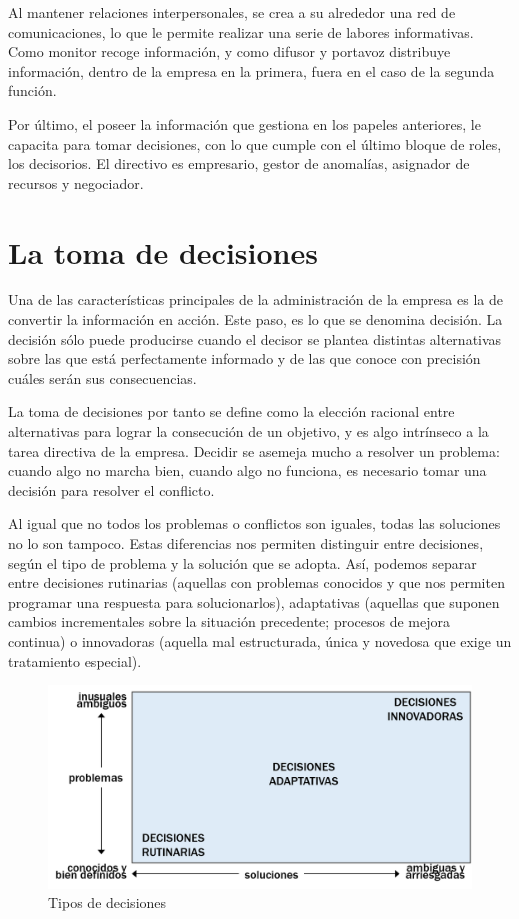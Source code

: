 \documentclass[
]{krantz}
\begin{document}
Al mantener relaciones interpersonales, se crea a su alrededor una red de comunicaciones, lo que le permite realizar una serie de labores informativas. Como monitor recoge información, y como difusor y portavoz distribuye información, dentro de la empresa en la primera, fuera en el caso de la segunda función.

Por último, el poseer la información que gestiona en los papeles anteriores, le capacita para tomar decisiones, con lo que cumple con el último bloque de roles, los decisorios. El directivo es empresario, gestor de anomalías, asignador de recursos y negociador.

\hypertarget{la-toma-de-decisiones}{%
\section{La toma de decisiones}\label{la-toma-de-decisiones}}

Una de las características principales de la administración de la empresa es la de convertir la información en acción. Este paso, es lo que se denomina decisión. La decisión sólo puede producirse cuando el decisor se plantea distintas alternativas sobre las que está perfectamente informado y de las que conoce con precisión cuáles serán sus consecuencias.

La toma de decisiones por tanto se define como la elección racional entre alternativas para lograr la consecución de un objetivo, y es algo intrínseco a la tarea directiva de la empresa. Decidir se asemeja mucho a resolver un problema: cuando algo no marcha bien, cuando algo no funciona, es necesario tomar una decisión para resolver el conflicto.

Al igual que no todos los problemas o conflictos son iguales, todas las soluciones no lo son tampoco. Estas diferencias nos permiten distinguir entre decisiones, según el tipo de problema y la solución que se adopta. Así, podemos separar entre decisiones rutinarias (aquellas con problemas conocidos y que nos permiten programar una respuesta para solucionarlos), adaptativas (aquellas que suponen cambios incrementales sobre la situación precedente; procesos de mejora continua) o innovadoras (aquella mal estructurada, única y novedosa que exige un tratamiento especial).

\begin{figure}

{\centering \includegraphics[width=0.85\linewidth]{images/20a-01} 

}

\caption{Tipos de decisiones}\label{fig:20a-01}
\end{figure}
\end{document}
